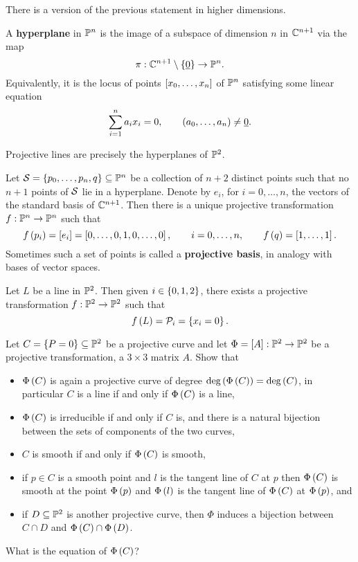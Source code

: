 There is a version of the previous statement in higher dimensions.

\begin{definition}
A \textbf{hyperplane} in $ \P^n $ is the image of a subspace of dimension $ n $ in $ \C^{n + 1} $ via the map
$$ \pi : \C^{n + 1} \setminus \cb{\underline{0}} \to \P^n. $$
Equivalently, it is the locus of points $ \sb{x_0, \dots, x_n} $ of $ \P^n $ satisfying some linear equation
$$ \sum_{i = 1}^n a_ix_i = 0, \qquad \rb{a_0, \dots, a_n} \ne \underline{0}. $$
\end{definition}

\begin{example}
Projective lines are precisely the hyperplanes of $ \P^2 $.
\end{example}

\begin{exercise}
Let $ \SS = \cb{p_0, \dots, p_n, q} \subseteq \P^n $ be a collection of $ n + 2 $ distinct points such that no $ n + 1 $ points of $ \SS $ lie in a hyperplane. Denote by $ e_i $, for $ i = 0, \dots, n $, the vectors of the standard basis of $ \C^{n + 1} $. Then there is a unique projective transformation $ f : \P^n \to \P^n $ such that
$$ f\rb{p_i} = \sb{e_i} = \sb{0, \dots, 0, 1, 0, \dots, 0}, \qquad i = 0, \dots, n, \qquad f\rb{q} = \sb{1, \dots, 1}. $$
Sometimes such a set of points is called a \textbf{projective basis}, in analogy with bases of vector spaces.
\end{exercise}

\begin{exercise}
Let $ L $ be a line in $ \P^2 $. Then given $ i \in \cb{0, 1, 2} $, there exists a projective transformation $ f : \P^2 \to \P^2 $ such that
$$ f\rb{L} = \PP_i = \cb{x_i = 0}. $$
\end{exercise}

\begin{exercise}
\label{ex:29}
Let $ C = \cb{P = 0} \subseteq \P^2 $ be a projective curve and let $ \Phi = \sb{A} : \P^2 \to \P^2 $ be a projective transformation, a $ 3 \times 3 $ matrix $ A $. Show that
\begin{itemize}
\item $ \Phi\rb{C} $ is again a projective curve of degree $ \deg\rb{\Phi\rb{C}} = \deg\rb{C} $, in particular $ C $ is a line if and only if $ \Phi\rb{C} $ is a line,
\item $ \Phi\rb{C} $ is irreducible if and only if $ C $ is, and there is a natural bijection between the sets of components of the two curves,
\item $ C $ is smooth if and only if $ \Phi\rb{C} $ is smooth,
\item if $ p \in C $ is a smooth point and $ l $ is the tangent line of $ C $ at $ p $ then $ \Phi\rb{C} $ is smooth at the point $ \Phi\rb{p} $ and $ \Phi\rb{l} $ is the tangent line of $ \Phi\rb{C} $ at $ \Phi\rb{p} $, and
\item if $ D \subseteq \P^2 $ is another projective curve, then $ \Phi $ induces a bijection between $ C \cap D $ and $ \Phi\rb{C} \cap \Phi\rb{D} $.
\end{itemize}
What is the equation of $ \Phi\rb{C} $?
\end{exercise}

